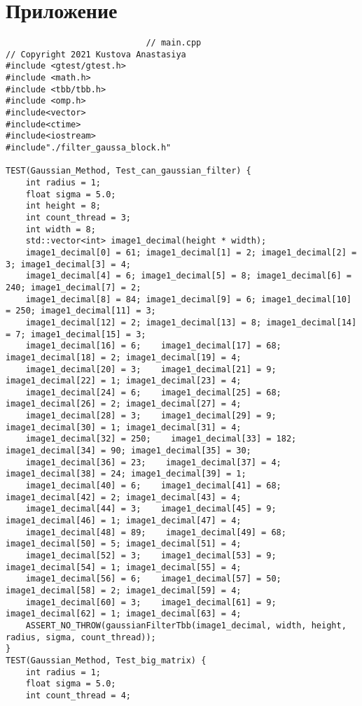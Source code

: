\documentclass{report}
\begin{document}
\section*{Приложение}
\begin{lstlisting}
							// main.cpp
// Copyright 2021 Kustova Anastasiya
#include <gtest/gtest.h>
#include <math.h>
#include <tbb/tbb.h>
#include <omp.h>
#include<vector>
#include<ctime>
#include<iostream>
#include"./filter_gaussa_block.h"

TEST(Gaussian_Method, Test_can_gaussian_filter) {
    int radius = 1;
    float sigma = 5.0;
    int height = 8;
    int count_thread = 3;
    int width = 8;
    std::vector<int> image1_decimal(height * width);
    image1_decimal[0] = 61; image1_decimal[1] = 2; image1_decimal[2] = 3; image1_decimal[3] = 4;
    image1_decimal[4] = 6; image1_decimal[5] = 8; image1_decimal[6] = 240; image1_decimal[7] = 2;
    image1_decimal[8] = 84; image1_decimal[9] = 6; image1_decimal[10] = 250; image1_decimal[11] = 3;
    image1_decimal[12] = 2; image1_decimal[13] = 8; image1_decimal[14] = 7; image1_decimal[15] = 3;
    image1_decimal[16] = 6;    image1_decimal[17] = 68; image1_decimal[18] = 2; image1_decimal[19] = 4;
    image1_decimal[20] = 3;    image1_decimal[21] = 9; image1_decimal[22] = 1; image1_decimal[23] = 4;
    image1_decimal[24] = 6;    image1_decimal[25] = 68; image1_decimal[26] = 2; image1_decimal[27] = 4;
    image1_decimal[28] = 3;    image1_decimal[29] = 9; image1_decimal[30] = 1; image1_decimal[31] = 4;
    image1_decimal[32] = 250;    image1_decimal[33] = 182; image1_decimal[34] = 90; image1_decimal[35] = 30;
    image1_decimal[36] = 23;    image1_decimal[37] = 4; image1_decimal[38] = 24; image1_decimal[39] = 1;
    image1_decimal[40] = 6;    image1_decimal[41] = 68; image1_decimal[42] = 2; image1_decimal[43] = 4;
    image1_decimal[44] = 3;    image1_decimal[45] = 9; image1_decimal[46] = 1; image1_decimal[47] = 4;
    image1_decimal[48] = 89;    image1_decimal[49] = 68; image1_decimal[50] = 5; image1_decimal[51] = 4;
    image1_decimal[52] = 3;    image1_decimal[53] = 9; image1_decimal[54] = 1; image1_decimal[55] = 4;
    image1_decimal[56] = 6;    image1_decimal[57] = 50; image1_decimal[58] = 2; image1_decimal[59] = 4;
    image1_decimal[60] = 3;    image1_decimal[61] = 9; image1_decimal[62] = 1; image1_decimal[63] = 4;
    ASSERT_NO_THROW(gaussianFilterTbb(image1_decimal, width, height, radius, sigma, count_thread));
}
TEST(Gaussian_Method, Test_big_matrix) {
    int radius = 1;
    float sigma = 5.0;
    int count_thread = 4;

\end{lstlisting}
\end{document}
